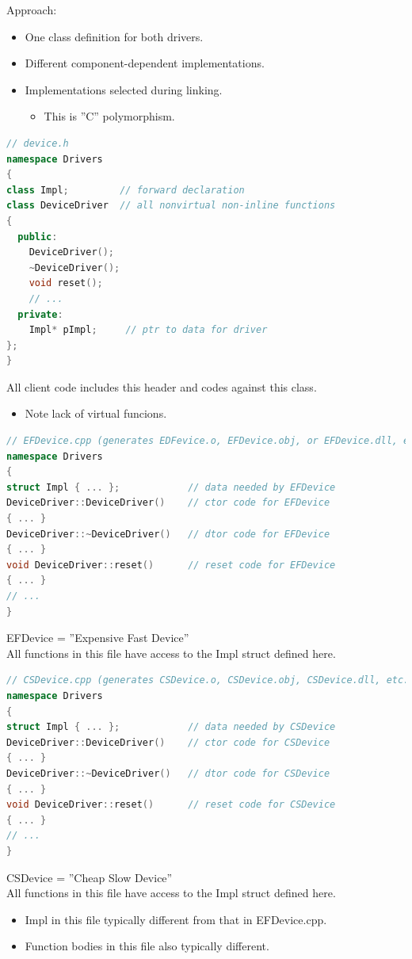Approach:
\begin{itemize}
  \item One class definition for both drivers.
  \item Different component-dependent implementations.
  \item Implementations selected during linking.
  \begin{itemize}
    \item This is ''C'' polymorphism.
  \end{itemize}
\end{itemize}
\begin{lstlisting}[language=C++]
// device.h
namespace Drivers
{
class Impl;         // forward declaration
class DeviceDriver  // all nonvirtual non-inline functions
{
  public:
    DeviceDriver();
    ~DeviceDriver();
    void reset();
    // ...
  private:
    Impl* pImpl;     // ptr to data for driver
};
}
\end{lstlisting}
All client code includes this header and codes against this class.
\begin{itemize}
  \item Note lack of virtual funcions.
\end{itemize}
\begin{lstlisting}[language=C++]
// EFDevice.cpp (generates EDFevice.o, EFDevice.obj, or EFDevice.dll, etc.)
namespace Drivers
{
struct Impl { ... };            // data needed by EFDevice
DeviceDriver::DeviceDriver()    // ctor code for EFDevice
{ ... }
DeviceDriver::~DeviceDriver()   // dtor code for EFDevice
{ ... }
void DeviceDriver::reset()      // reset code for EFDevice
{ ... }
// ...
}
\end{lstlisting}
EFDevice = ''Expensive Fast Device''\\
All functions in this file have access to the Impl struct defined here.

\begin{lstlisting}[language=C++]
// CSDevice.cpp (generates CSDevice.o, CSDevice.obj, CSDevice.dll, etc.)
namespace Drivers
{
struct Impl { ... };            // data needed by CSDevice
DeviceDriver::DeviceDriver()    // ctor code for CSDevice
{ ... }
DeviceDriver::~DeviceDriver()   // dtor code for CSDevice
{ ... }
void DeviceDriver::reset()      // reset code for CSDevice
{ ... }
// ...
}
\end{lstlisting}
CSDevice = ''Cheap Slow Device''\\
All functions in this file have access to the Impl struct defined here.
\begin{itemize}
  \item Impl in this file typically different from that in EFDevice.cpp.
  \item Function bodies in this file also typically different.
\end{itemize}

